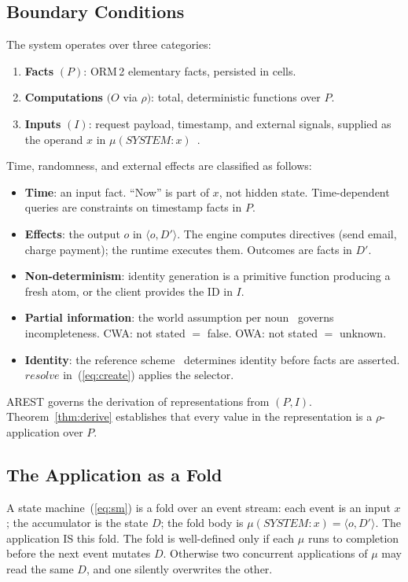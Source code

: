 \documentclass[acmsmall,screen,review]{acmart}
\begin{document}
\subsection{Boundary Conditions}

The system operates over three categories:
\begin{enumerate}[nosep]
\item \textbf{Facts} $(P)$: ORM\,2 elementary facts, persisted in cells.
\item \textbf{Computations} $(O$ via $\rho)$: total, deterministic functions over $P$.
\item \textbf{Inputs} $(I)$: request payload, timestamp, and external signals, supplied as the operand $x$ in $\mu(\mathit{SYSTEM}\!:\!x)$~\cite[Sec.\,14.3.1]{backus78}.
\end{enumerate}

Time, randomness, and external effects are classified as follows:
\begin{itemize}[nosep]
\item \textbf{Time}: an input fact. ``Now'' is part of $x$, not hidden state. Time-dependent queries are constraints on timestamp facts in $P$.
\item \textbf{Effects}: the output $o$ in $\langle o, D'\rangle$. The engine computes directives (send email, charge payment); the runtime executes them. Outcomes are facts in $D'$.
\item \textbf{Non-determinism}: identity generation is a primitive function producing a fresh atom, or the client provides the ID in $I$.
\item \textbf{Partial information}: the world assumption per noun~\cite[Ch.\,7]{halpin08} governs incompleteness. CWA: not stated $=$ false. OWA: not stated $=$ unknown.
\item \textbf{Identity}: the reference scheme~\cite[Ch.\,5]{halpin08} determines identity before facts are asserted. $\mathit{resolve}$ in~(\ref{eq:create}) applies the selector.
\end{itemize}

AREST governs the derivation of representations from $(P, I)$. Theorem~\ref{thm:derive} establishes that every value in the representation is a $\rho$-application over $P$.

\subsection{The Application as a Fold}

A state machine~(\ref{eq:sm}) is a fold over an event stream: each event is an input $x$; the accumulator is the state $D$; the fold body is $\mu(\mathit{SYSTEM}\!:\!x) = \langle o, D'\rangle$. The application IS this fold. The fold is well-defined only if each $\mu$ runs to completion before the next event mutates $D$. Otherwise two concurrent applications of $\mu$ may read the same $D$, and one silently overwrites the other.
\end{document}
